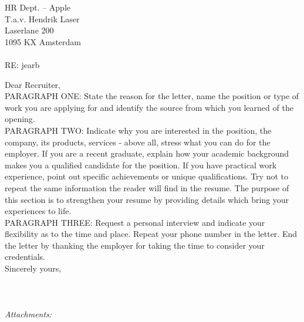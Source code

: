 \documentclass[paper=letter]{scrlttr2}
\begin{document}


\begin{letter}{ %
HR Dept. -- Apple\\
T.a.v. Hendrik Laser\\
Laserlane 200\\
1095 KX Amsterdam\\
~\\
RE: jearb
}


\opening{ }

 \addvspace{3cm} %

Dear Recruiter,\\ %

PARAGRAPH ONE: State the reason for the letter, name the position or type of work you
are applying for and identify the source from which you learned of the opening.\\

PARAGRAPH TWO: Indicate why you are interested in the position, the company, its products,
services - above all, stress what you can do for the employer. If you are a recent graduate,
explain how your academic background makes you a qualified candidate for the position. If
you have practical work experience, point out specific achievements or unique qualifications.
Try not to repeat the same information the reader will find in the resume. The purpose of this
section is to strengthen your resume by providing details which bring your experiences to life.\\

PARAGRAPH THREE: Request a personal interview and indicate your flexibility as to the
time and place. Repeat your phone number in the letter. End the letter by thanking the employer
for taking the time to consider your credentials.\\

Sincerely yours,\\
~\\\\
\\

\emph{Attachments: }


\end{letter}
\end{document}

